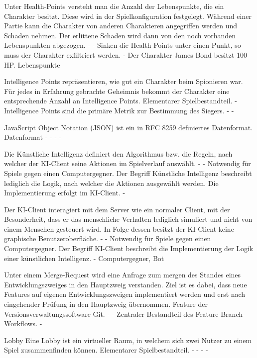 {Unter Health-Points versteht man die Anzahl der Lebenspunkte, die ein Charakter besitzt. Diese wird in der Spielkonfiguration festgelegt. Während einer Partie kann die Charakter von anderen Charakteren angegriffen werden und Schaden nehmen. Der erlittene Schaden wird dann von den noch vorhanden Lebenspunkten abgezogen.}
{-}
{-}
{Sinken die Health-Points unter einen Punkt, so muss der Charakter exfiltriert werden.}
{-}
{Der Charakter \glqq{}James Bond\grqq{} besitzt 100 HP.}
{Lebenspunkte}

{Intelligence Points repräsentieren, wie gut ein Charakter beim Spionieren war. Für jedes in Erfahrung gebrachte Geheimnis bekommt der Charakter eine entsprechende Anzahl an Intelligence Points.}
{Elementarer Spielbestandteil.}
{-}
{Intelligence Points sind die primäre Metrik zur Bestimmung des Siegers.}
{-}
{-}

{JavaScript Object Notation (JSON) ist ein in RFC 8259 definiertes Datenformat.}
{Datenformat}
{-}
{-}
{-}
{-}

{Die Künstliche Intelligenz definiert den Algorithmus bzw. die Regeln, nach welcher der KI-Client seine Aktionen im Spielverlauf auswählt.}
{-}
{-}
{Notwendig für Spiele gegen einen Computergegner.}
{Der Begriff \glqq{}Künstliche Intelligenz\grqq{} beschreibt lediglich die Logik, nach welcher die Aktionen ausgewählt werden. Die Implementierung erfolgt im KI-Client.}
{-}

{Der KI-Client interagiert mit dem Server wie ein normaler Client, mit der Besonderheit, dass er das menschliche Verhalten lediglich simuliert und nicht von einem Menschen gesteuert wird. In Folge dessen besitzt der KI-Client keine graphische Benutzeroberfläche. }
{-}
{-}
{Notwendig für Spiele gegen einen Computergegner.}
{Der Begriff KI-Client beschreibt die Implementierung der Logik einer künstlichen Intelligenz.}
{-}
{Computergegner, Bot}

{Unter einem Merge-Request wird eine Anfrage zum \glqq{}mergen \grqq{} des Standes eines Entwicklungszweiges in den Hauptzweig verstanden. Ziel ist es dabei, dass neue Features auf eigenen Entwicklungszweigen implementiert werden und erst nach eingehender Prüfung in den Hauptzweig übernommen.}
{Feature der Versionsverwaltungssoftware Git.}
{-}
{-}
{Zentraler Bestandteil des Feature-Branch-Workflows.}
{-}

\Fachwissen
{Lobby}
{Eine Lobby ist ein virtueller Raum, in welchem sich zwei Nutzer zu einem Spiel zusammenfinden können.}
{Elementarer Spielbestandteil.}
{-}
{-}
{-}
{-}

